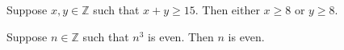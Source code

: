 \documentclass[a4paper,11pt]{article}
\begin{document}
\begin{required}
Suppose $x, y \in \mathbb{Z}$ such that $x + y \geq 15$. Then either $x \geq 8$ or $y \geq 8$. 
\end{required}

\begin{required}
Suppose $n \in \mathbb{Z}$ such that $n^{3}$ is even. Then $n$ is even.
\end{required}
\end{document}
